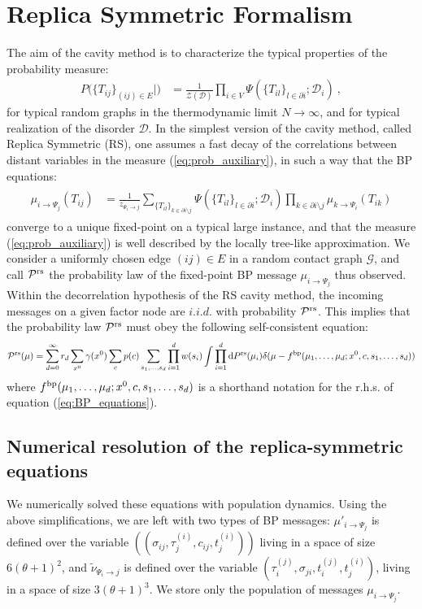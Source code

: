\documentclass[a4paper, amsfonts, amssymb, amsmath, reprint, showkeys, nofootinbib, twoside, floatfix, pre,superscriptaddress, onecolumn]{revtex4-2}
\begin{document}
\section{Replica Symmetric Formalism} 
The aim of the cavity method is to characterize the typical properties of the probability measure:
\begin{align}
\label{eq:prob_auxiliary}
P(\{T_{ij}\}_{(ij)\in E}|\mathcal) &= \frac{1}{\mathcal{Z}(\mathcal{D})}\prod_{i\in V}\Psi(\{T_{il}\}_{l\in\partial i};\mathcal{D}_i) \ ,
\end{align}
for typical random graphs in the thermodynamic limit $N\to\infty$, and for typical realization of the disorder $\mathcal{D}$.
In the simplest version of the cavity method, called Replica Symmetric (RS), one assumes a fast decay of the correlations between distant variables in the measure (\ref{eq:prob_auxiliary}), in such a way that the BP equations:
\begin{align}
\label{eq:BP_equations}
\begin{aligned}
\mu_{i\to \Psi_j}(T_{ij}) &= \frac{1}{z_{\Psi_i\to j}}\sum_{\{T_{il}\}_{k\in\partial i \setminus j}}\Psi(\{T_{il}\}_{l\in\partial i};\mathcal{D}_i)\prod_{k\in\partial i \setminus j}\mu_{k\to\Psi_i}(T_{ik})
\end{aligned}
\end{align}
converge to a unique fixed-point on a typical large instance, and that the measure (\ref{eq:prob_auxiliary}) is well described by the locally tree-like approximation.
We consider a uniformly chosen edge $(ij)\in E$ in a random contact graph $\mathcal{G}$, and call $\mathcal{P}^{\rm rs}$ the probability law of the fixed-point BP message $\mu_{i\to \Psi_j}$ thus observed.
Within the decorrelation hypothesis of the RS cavity method, the incoming messages on a given factor node are $i.i.d.$ with probability $\mathcal{P}^{\rm rs}$.
This implies that the probability law $\mathcal{P}^{\rm rs}$ must obey the following self-consistent equation:
	\begin{align}
	\mathcal{P}^{\rm rs}(\mu) = \sum_{d=0}^\infty r_d\sum_{x^0}\gamma(x^0)\sum_c p(c)\sum_{s_1,\dots,s_d}\prod_{i=1}^dw(s_i)\int\prod_{i=1}^d{\rm d}P^{\rm rs}(\mu_i)\delta(\mu - f^{\rm bp}(\mu_1,\dots,\mu_d;x^0,c,s_1,\dots,s_d))
	\end{align}
where $f^{\rm bp}(\mu_1,\dots,\mu_d;x^0,c,s_1,\dots,s_d)$ is a shorthand notation for the r.h.s. of equation (\ref{eq:BP_equations}).

\subsection{Numerical resolution of the replica-symmetric equations}	
We numerically solved these equations with population dynamics.
Using the above simplifications, we are left with two types of BP messages: $\mu'_{i\to\Psi_j}$ is defined over the variable $((\sigma_{ij},\tau_j^{(i)},c_{ij},t_j^{(i)}))$ living in a space of size $6(\theta+1)^2$, and $\tilde{\nu}_{\Psi_i\to j}$ is defined over the variable $(\tau_i^{(j)},\sigma_{ji},t_i^{(j)},t_j^{(i)})$, living in a space of size $3(\theta+1)^3$.
We store only the population of messages $\mu_{i\to \Psi_j}$.
\end{document}
